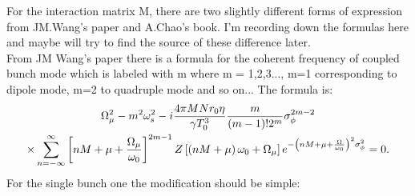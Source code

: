 \documentclass{article}
\begin{document}
	For the interaction matrix M, there are two slightly different forms of expression from JM.Wang's paper and A.Chao's book. I'm recording down the formulas here and maybe will try to find the source of these difference later.\\
	
	From JM Wang's paper \cite{Wang1987} there is a formula for the coherent frequency of coupled bunch mode which is labeled with m where m = 1,2,3..., m=1 corresponding to dipole mode, m=2 to quadruple mode and so on...
	The formula is: 
	{\begin{multline}\label{equ:JMWang1}
		\Omega_\mu^2-m^2\omega_s^2
		-i\frac{4\pi MNr_0\eta}{\gamma T_0^3}\frac{m}{(m-1)!2^m}\sigma_\phi^{2m-2}\\
		\times \sum_{n=-\infty}^{\infty}{\left[nM+\mu+\frac{\Omega_\mu}{\omega_0}\right]^{2m-1}Z\left[\left(nM+\mu\right)\omega_0+\Omega_\mu\right]e^{-\left(nM+\mu+{\Omega \over \omega_0}\right)^2\sigma_\phi^2}}=0.
		\end{multline}}
	For the single bunch one the modification should be simple:
	
\end{document}
